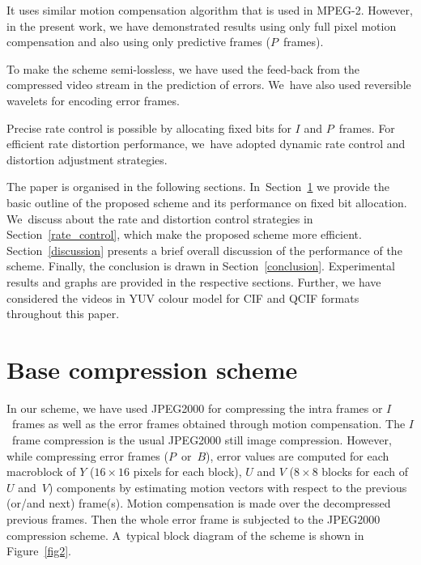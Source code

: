 \documentclass{doublecol-new}
\theoremstyle{TH}{
\newtheorem{lemma}{Lemma}[section]
\newtheorem{theorem}{Theorem}
\newtheorem{corrolary}{Corrolary}
\newtheorem{conjecture}[lemma]{Conjecture}
\newtheorem{proposition}[lemma]{Proposition}
\newtheorem{claim}[lemma]{Claim}
\newtheorem{stheorem}[lemma]{Wrong Theorem}
}
\theoremstyle{THrm}{
\newtheorem{definition}{Definition}[section]
\newtheorem{question}{Question}[section]
\newtheorem{remark}{Remark}[section]
\newtheorem{scheme}{Scheme}
}
\theoremstyle{THhit}{
\newtheorem{case}{Case}[section]
}
\begin{document}
\begin{NLh}{3}
\item[1] It uses similar motion compensation algorithm that is
used in MPEG-2. However, in the present work, we have demonstrated results using
only full pixel motion compensation and also using only predictive frames
($P$~frames).

\item[2] To make the scheme semi-lossless, we have used the
feed-back from the  compressed video stream in the prediction of errors. We~have
also used reversible wavelets for encoding error frames.

\item[3] Precise rate control is possible by allocating fixed bits
for $I$ and $P$~frames. For efficient rate distortion performance, we~have
adopted  dynamic rate control and distortion adjustment strategies.
\end{NLh}
The paper is organised in the following sections. In~Section~\ref{base_algo} we
provide the basic outline of the proposed scheme and its performance on fixed
bit allocation. We~discuss about the rate and distortion control strategies in
Section~\ref{rate_control}, which make the proposed  scheme more efficient.
Section~\ref{discussion} presents a brief overall discussion of the performance
of the scheme. Finally, the conclusion is drawn in Section~\ref{conclusion}.
Experimental results and graphs are provided in the respective sections.
Further, we have considered the videos in YUV colour model for CIF and QCIF
formats throughout this paper.

\vspace*{-0.5pc}
\section{Base compression scheme}\label{base_algo}

In our scheme, we have used JPEG2000 for compressing the intra frames
or $I$~frames as well as the error frames obtained through motion
compensation. The $I$~frame compression is the usual JPEG2000 still
image compression. However, while compressing error frames
($P$~or~$B$), error values are computed for each macroblock of $Y$
($16\times 16$ pixels for each block), $U$ and $V$ ($8\times
 8$ blocks for each of $U$ and~$V$) components by estimating motion
vectors with respect to the previous (or/and next) frame(s). Motion compensation
is made over the decompressed previous frames. Then the whole error frame is
subjected to the JPEG2000 compression scheme. A~typical block diagram of the
scheme is shown in Figure~\ref{fig2}.
\end{document}
